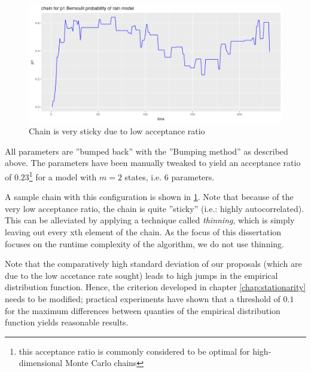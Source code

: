 \begin{figure}
	\includegraphics[width=\linewidth]{img/impl_very_sticky_no_thinning.png}
	\caption{Chain is very sticky due to low acceptance ratio}
	\label{fig:sticky_chain_is_okay}
\end{figure} 

All parameters are ''bumped back'' with the ''Bumping method'' as described above. The parameters have been manually tweaked to yield an acceptance ratio of $0.23$\footnote{this acceptance ratio is commonly considered to be optimal for high-dimensional Monte Carlo chains} for a model with $m=2$ states, i.e. $6$ parameters. 

A sample chain with this configuration is shown in \ref{fig:sticky_chain_is_okay}. Note that because of the very low acceptance ratio, the chain is quite ''sticky'' (i.e.: highly autocorrelated). This can be alleviated by applying a technique called \textit{thinning}, which is simply leaving out every xth element of the chain. As the focus of this dissertation focuses on the runtime complexity of the algorithm, we do not use thinning. 

Note that the comparatively high standard deviation of our proposals (which are due to the low accetance rate sought) leads to high jumps in the empirical distribution function. Hence, the criterion developed in chapter \ref{chap:stationarity} needs to be modified; practical experiments have shown that a threshold of $0.1$ for the maximum differences between quanties of the empirical distribution function yields reasonable results. 



